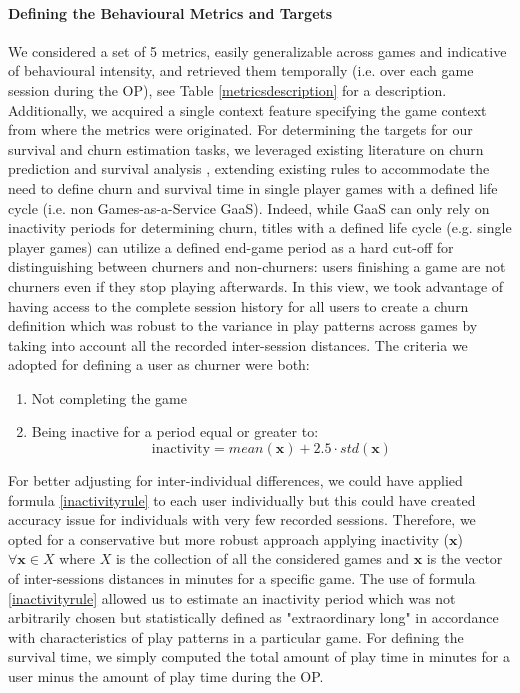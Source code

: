 \paragraph*{Defining the Behavioural Metrics and Targets}
\label{behavioural_metric_targets_1}
We considered a set of 5 metrics, easily generalizable across games and indicative of behavioural intensity, and retrieved them temporally  (i.e. over each game session during the OP), see Table \ref{metricsdescription} for a description. Additionally, we acquired a single context feature specifying the game context from where the metrics were originated. For determining the targets for our survival and churn estimation tasks, we leveraged existing literature on churn prediction \cite{drachen2016rapid, milovsevic2017early, lee2018game, perianez2016churn, runge2014churn, kim2017churn, hadiji2014predicting, xie2015predicting} and survival analysis \cite{viljanen2018playtime, demediuk2018player, lee2018game, bertens2017games}, extending existing rules to accommodate the need to define churn and survival time in single player games with a defined life cycle (i.e. non Games-as-a-Service GaaS). Indeed, while GaaS can only rely on inactivity periods for determining churn, titles with a defined life cycle (e.g. single player games) can utilize a defined end-game period as a hard cut-off for distinguishing between churners and non-churners: users finishing a game are not churners even if they stop playing afterwards. In this view, we took advantage of having access to the complete session history for all users to create a churn definition which was robust to the variance in play patterns across games by taking into account all the recorded inter-session distances. The criteria we adopted for defining a user as churner were both: 

\begin{enumerate}
    \item Not completing the game
    \item Being inactive for a period equal or greater to:
        \begin{equation}
            \label{inactivityrule}
            \text{inactivity} = 
            mean(\mathbf{x}) + 2.5 \cdot std(\mathbf{x})
        \end{equation}
\end{enumerate}

For better adjusting for inter-individual differences, we could have applied formula \ref{inactivityrule} to each user individually but this could have created accuracy issue for individuals with very few recorded sessions. Therefore, we opted for a conservative but more robust approach applying inactivity ($\mathbf{x}$) $\forall \mathbf{x} \in X$ where $X$ is the collection of all the considered games and $\mathbf{x}$ is the vector of inter-sessions distances in minutes for a specific game. The use of formula \ref{inactivityrule} allowed us to estimate an inactivity period which was not arbitrarily chosen but statistically defined as "extraordinary long" in accordance with characteristics of play patterns in a particular game. For defining the survival time, we simply computed the total amount of play time in minutes for a user minus the amount of play time during the OP.

